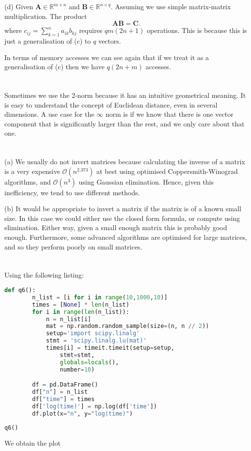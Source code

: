 \documentclass{article}
\newcommand{\R}{\mathbb{R}}
\renewcommand{\O}[1]{\mathcal{O}(#1)}
\begin{document}
(d) Given $\bm{A} \in \R^{m\times n}$ and $\bm{B} \in \R^{n\times q}$. Assuming
we use simple matrix-matrix multiplication. The product
$$\bm{A}\bm{B} = \bm{C}.$$
where $c_{ij} = \sum_{k=1}^n a_{ik}b_{kj}$ requires $qm(2n+1)$ operations.
This is because this is just a generalisation of (c) to $q$ vectors.

In terms of memory accesses we can see again that if we treat it as a generalisation
of (c) then we have $q(2n+m)$ accesses.

\section{} %
Sometimes we use the 2-norm because it has an intuitive geometrical meaning.
It is easy to understand the concept of Euclidean distance, even in several
dimensions. A use case for the $\infty$ norm is if we know that there is one
vector component that is significantly larger than the rest, and we only
care about that one.

\section{} %
 (a) We usually do not invert matrices because calculating the inverse of
a matrix is a very expensive $\O{n^{2.373}}$ at best using optimised
Coppersmith-Winograd algorithms, and $\O{n^3}$ using Gaussian elimination.
Hence, given this inefficiency, we tend to use different methods.

(b) It would be appropriate to invert a matrix if the matrix is of a known small
size. In this case we could either use the closed form formula, or compute using
elimination. Either way, given a small enough matrix this is probably good enough.
Furthermore, some advanced algorithms are optimised for large matrices, and so
they perform poorly on small matrices.

\section{} %
Using the following listing:

\begin{lstlisting}[language=Python]
    def q6():
        n_list = [i for i in range(10,1000,10)]
        times = [None] * len(n_list)
        for i in range(len(n_list)):
            n = n_list[i]
            mat = np.random.random_sample(size=(n, n // 2))
            setup='import scipy.linalg'
            stmt = 'scipy.linalg.lu(mat)'
            times[i] = timeit.timeit(setup=setup,
                stmt=stmt,
                globals=locals(),
                number=10)

        df = pd.DataFrame()
        df["n"] = n_list
        df["time"] = times
        df['log(time)'] = np.log(df['time'])
        df.plot(x="n", y="log(time)")
        
q6() 
\end{lstlisting}
We obtain the plot
\end{document}
